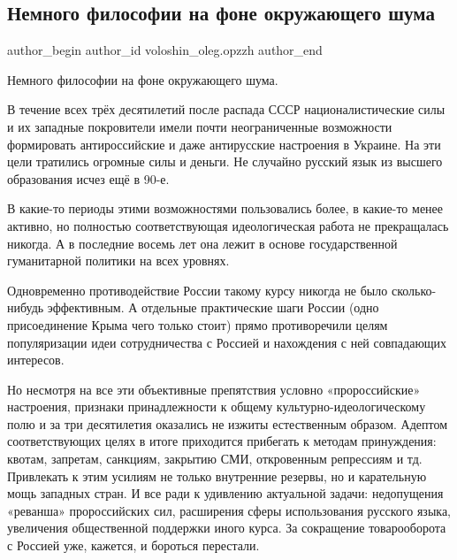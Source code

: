  
 
 
 
 
 
\subsection{Немного философии на фоне окружающего шума}
\label{sec:26_01_2022.fb.voloshin_oleg.opzzh.1.filosofia_na_fone_shuma}
 
\ifcmt
 author_begin
   author_id voloshin_oleg.opzzh
 author_end
\fi

Немного философии на фоне окружающего шума. 

В течение всех трёх десятилетий после распада СССР националистические силы и их
западные покровители имели почти неограниченные возможности формировать
антироссийские и даже антирусские настроения в Украине. На эти цели тратились
огромные силы и деньги. Не случайно русский язык из высшего образования исчез
ещё в 90-е. 

В какие-то периоды этими возможностями пользовались более, в какие-то менее
активно, но полностью соответствующая идеологическая работа не прекращалась
никогда. А в последние восемь лет она лежит в основе государственной
гуманитарной политики на всех уровнях. 

Одновременно противодействие России такому курсу никогда не было сколько-нибудь
эффективным. А отдельные практические шаги России (одно присоединение Крыма
чего только стоит) прямо противоречили целям популяризации идеи сотрудничества
с Россией и нахождения с ней совпадающих интересов. 

Но несмотря на все эти объективные препятствия условно «пророссийские»
настроения, признаки принадлежности к общему культурно-идеологическому полю и
за три десятилетия оказались не изжиты естественным образом. Адептом
соответствующих целях в итоге приходится прибегать к методам принуждения:
квотам, запретам, санкциям, закрытию СМИ, откровенным репрессиям и тд.
Привлекать к этим усилиям не только внутренние резервы, но и карательную мощь
западных стран. И все ради к удивлению актуальной задачи: недопущения «реванша»
пророссийских сил, расширения сферы использования русского языка, увеличения
общественной поддержки иного курса. За сокращение товарооборота с Россией уже,
кажется, и бороться перестали. 

